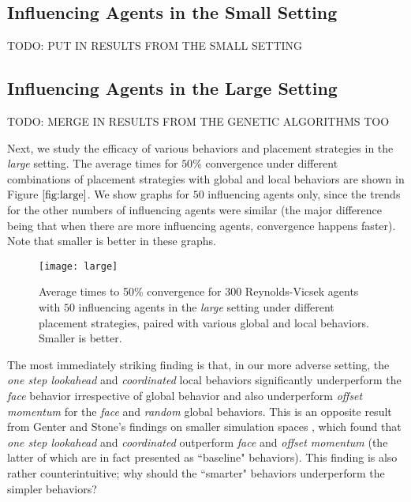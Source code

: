 \subsection{Influencing Agents in the Small Setting}
TODO: PUT IN RESULTS FROM THE SMALL SETTING

\subsection{Influencing Agents in the Large Setting}
TODO: MERGE IN RESULTS FROM THE GENETIC ALGORITHMS TOO

Next, we study the efficacy of various behaviors and placement strategies in
the \textit{large} setting.
The average times for $50\%$ convergence under different combinations of placement
strategies with global and local behaviors are shown in Figure $\ref{fig:large}$.
We show graphs for $50$ influencing agents only, since the trends for the other
numbers of influencing agents were similar (the major difference being that
when there are more influencing agents, convergence happens faster).
Note that smaller is better in these graphs.
\begin{figure}
    \texttt{[image: large]}
    \caption{Average times to 50\% convergence for $300$ Reynolds-Vicsek agents
    with $50$ influencing agents in the \textit{large} setting under different
    placement strategies, paired with various global and local behaviors.
    Smaller is better.}
    \label{fig:large}
\end{figure}
The most immediately striking finding is that, in our more adverse setting,
the \textit{one step lookahead} and \textit{coordinated} local behaviors
significantly underperform the \textit{face} behavior irrespective of global
behavior and also underperform \textit{offset momentum} for the \textit{face}
and \textit{random} global behaviors.
This is an opposite result from Genter and Stone's findings on smaller simulation
spaces \cite{genter201612steplookahead, genterthesis}, which found that
\textit{one step lookahead} and \textit{coordinated} outperform \textit{face}
and \textit{offset momentum} (the latter of which are in fact presented as
``baseline" behaviors).
This finding is also rather counterintuitive; why should the ``smarter" behaviors
underperform the simpler behaviors?

